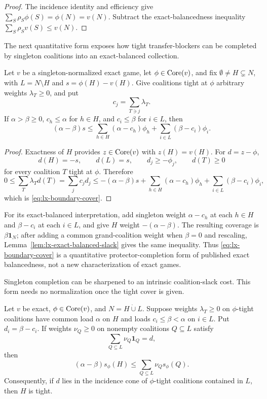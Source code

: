 \begin{proof}
The incidence identity and efficiency give
$\sum_S\rho_S\phi(S)=\phi(N)=v(N)$.  Subtract the exact-balancedness
inequality $\sum_S\rho_Sv(S)\leq v(N)$.
\end{proof}

The next quantitative form exposes how tight transfer-blockers can be
completed by singleton coalitions into an exact-balanced collection.

\begin{lemma}
\label{lem:lx-boundary-cover}
Let $v$ be a singleton-normalized exact game, let $\phi\in\operatorname{Core}(v)$, and fix
$\emptyset\ne H\subsetneq N$, with $L=N\setminus H$ and
$s=\phi(H)-v(H)$.  Give coalitions tight at $\phi$ arbitrary weights
$\lambda_T\geq0$, and put
\[
 c_j=\sum_{T\ni j}\lambda_T.
\]
If $\alpha>\beta\geq0$, $c_h\leq\alpha$ for $h\in H$, and
$c_i\leq\beta$ for $i\in L$, then
\[
 (\alpha-\beta)s\leq
 \sum_{h\in H}(\alpha-c_h)\phi_h
 +\sum_{i\in L}(\beta-c_i)\phi_i.                    \tag{BC}
 \label{eq:lx-boundary-cover}
\]
\end{lemma}

\begin{proof}
Exactness of $H$ provides $z\in\operatorname{Core}(v)$ with $z(H)=v(H)$.  For
$d=z-\phi$,
\[
 d(H)=-s,\qquad d(L)=s,\qquad d_j\geq-\phi_j,
 \qquad d(T)\geq0
\]
for every coalition $T$ tight at $\phi$.  Therefore
\[
 0\leq\sum_T\lambda_Td(T)=\sum_jc_jd_j
 \leq-(\alpha-\beta)s
 +\sum_{h\in H}(\alpha-c_h)\phi_h
 +\sum_{i\in L}(\beta-c_i)\phi_i,
\]
which is \eqref{eq:lx-boundary-cover}.
\end{proof}

For its exact-balanced interpretation, add singleton weight
$\alpha-c_h$ at each $h\in H$ and $\beta-c_i$ at each $i\in L$, and give
$H$ weight $-(\alpha-\beta)$.  The resulting coverage is
$\beta\mathbf1_N$; after adding a common grand-coalition weight when
$\beta=0$ and rescaling, Lemma~\ref{lem:lx-exact-balanced-slack} gives the
same inequality.  Thus \eqref{eq:lx-boundary-cover} is a quantitative
protector-completion form of published exact balancedness, not a new
characterization of exact games.

Singleton completion can be sharpened to an intrinsic coalition-slack cost.
This form needs no normalization once the tight cover is given.

\begin{theorem}
\label{thm:lx-tight-deficit-completion}
Let $v$ be exact, $\phi\in\operatorname{Core}(v)$, and
$N=H\mathbin{\dot\cup}L$. Suppose weights $\lambda_T\geq0$ on
$\phi$-tight coalitions have common load $\alpha$ on $H$ and loads
$c_i\leq\beta<\alpha$ on $i\in L$. Put $d_i=\beta-c_i$. If weights
$\nu_Q\geq0$ on nonempty coalitions $Q\subseteq L$ satisfy
\[
 \sum_{Q\subseteq L}\nu_Q\mathbf1_Q=d,
\]
then
\[
 (\alpha-\beta)s_\phi(H)\leq
 \sum_{Q\subseteq L}\nu_Qs_\phi(Q).                 \tag{DC}
 \label{eq:lx-tight-deficit-completion}
\]
Consequently, if $d$ lies in the incidence cone of $\phi$-tight coalitions
contained in $L$, then $H$ is tight.
\end{theorem}

